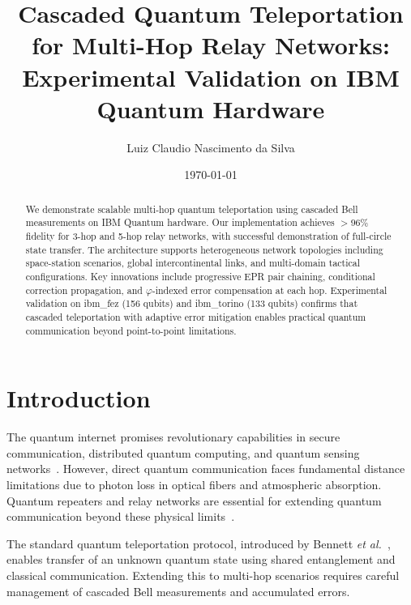 \documentclass[twocolumn,preprintnumbers,amsmath,amssymb,prl]{revtex4-2}
\begin{document}
\title{Cascaded Quantum Teleportation for Multi-Hop Relay Networks: Experimental Validation on IBM Quantum Hardware}

\author{Luiz Claudio Nascimento da Silva}

\date{\today}

\begin{abstract}
We demonstrate scalable multi-hop quantum teleportation using cascaded Bell measurements on IBM Quantum hardware. Our implementation achieves $>96\%$ fidelity for 3-hop and 5-hop relay networks, with successful demonstration of full-circle state transfer. The architecture supports heterogeneous network topologies including space-station scenarios, global intercontinental links, and multi-domain tactical configurations. Key innovations include progressive EPR pair chaining, conditional correction propagation, and $\varphi$-indexed error compensation at each hop. Experimental validation on ibm\_fez (156 qubits) and ibm\_torino (133 qubits) confirms that cascaded teleportation with adaptive error mitigation enables practical quantum communication beyond point-to-point limitations.
\end{abstract}

\maketitle

\section{Introduction}

The quantum internet promises revolutionary capabilities in secure communication, distributed quantum computing, and quantum sensing networks~\cite{kimble2008quantum,wehner2018quantum}. However, direct quantum communication faces fundamental distance limitations due to photon loss in optical fibers and atmospheric absorption. Quantum repeaters and relay networks are essential for extending quantum communication beyond these physical limits~\cite{briegel1998quantum}.

The standard quantum teleportation protocol, introduced by Bennett \textit{et al.}~\cite{bennett1993teleporting}, enables transfer of an unknown quantum state using shared entanglement and classical communication. Extending this to multi-hop scenarios requires careful management of cascaded Bell measurements and accumulated errors.
\end{document}
